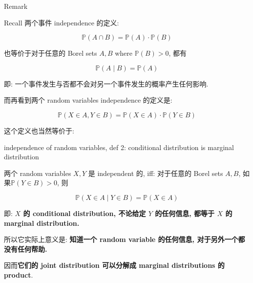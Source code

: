 \documentclass{qlnotes-export}
\begin{document}
\begin{qlremark}{Remark}

Recall 两个事件 independence 的定义:

\[{\mathbb{P}}(A \cap B) = {\mathbb{P}}(A) \cdot {\mathbb{P}}(B)\]

也等价于对于任意的 Borel sets \(A,B\) where \({\mathbb{P}}(B) > 0\), 都有

\[{\mathbb{P}}(A \mid B) = {\mathbb{P}}(A)\]

即: 一个事件发生与否都不会对另一个事件发生的概率产生任何影响.

而再看到两个 random variables independence 的定义是:

\[{\mathbb{P}}(X \in A,Y \in B) = {\mathbb{P}}(X \in A) \cdot {\mathbb{P}}(Y \in B)\]

这个定义也当然等价于:

\begin{proposition}{independence of random variables, def 2: conditional distribution is
marginal distribution}\label{prop-03-joint-conditional-distribution-independence-of-random-variables-def-2-conditional-distribution}

两个 random variables \(X,Y\) 是 independent 的, iff: 对于任意的 Borel sets \(A,B\), 如果\({\mathbb{P}}(Y \in B) > 0\), 则

\[{\mathbb{P}}(X \in A \mid Y \in B) = {\mathbb{P}}(X \in A)\]

即: \textbf{\(X\) 的 conditional distribution, 不论给定 \(Y\) 的任何信息, 都等于 \(X\) 的 marginal distribution.}

\end{proposition}

所以它实际上意义是: \textbf{知道一个 random variable 的任何信息, 对于另外一个都没有任何帮助.}

因而\textbf{它们的 joint distribution 可以分解成 marginal distributions 的 product}.\\

\end{qlremark}
\end{document}
